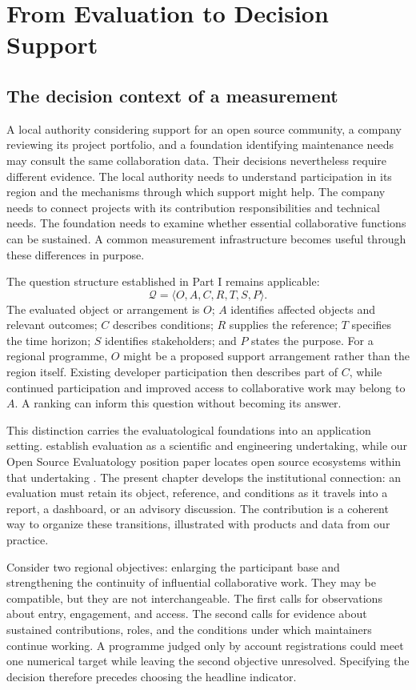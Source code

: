 \section{From Evaluation to Decision Support}
\label{sec:ch10-decision}

\subsection{The decision context of a measurement}
A local authority considering support for an open source community, a company reviewing its project portfolio, and a foundation identifying maintenance needs may consult the same collaboration data. Their decisions nevertheless require different evidence. The local authority needs to understand participation in its region and the mechanisms through which support might help. The company needs to connect projects with its contribution responsibilities and technical needs. The foundation needs to examine whether essential collaborative functions can be sustained. A common measurement infrastructure becomes useful through these differences in purpose.

The question structure established in Part I remains applicable:
\[
\mathcal Q=\langle O,A,C,R,T,S,P\rangle.
\]
The evaluated object or arrangement is \(O\); \(A\) identifies affected objects and relevant outcomes; \(C\) describes conditions; \(R\) supplies the reference; \(T\) specifies the time horizon; \(S\) identifies stakeholders; and \(P\) states the purpose. For a regional programme, \(O\) might be a proposed support arrangement rather than the region itself. Existing developer participation then describes part of \(C\), while continued participation and improved access to collaborative work may belong to \(A\). A ranking can inform this question without becoming its answer.

This distinction carries the evaluatological foundations into an application setting. \citet{zhan2024} establish evaluation as a scientific and engineering undertaking, while our Open Source Evaluatology position paper locates open source ecosystems within that undertaking \citep{han2024ose}. The present chapter develops the institutional connection: an evaluation must retain its object, reference, and conditions as it travels into a report, a dashboard, or an advisory discussion. The contribution is a coherent way to organize these transitions, illustrated with products and data from our practice.

Consider two regional objectives: enlarging the participant base and strengthening the continuity of influential collaborative work. They may be compatible, but they are not interchangeable. The first calls for observations about entry, engagement, and access. The second calls for evidence about sustained contributions, roles, and the conditions under which maintainers continue working. A programme judged only by account registrations could meet one numerical target while leaving the second objective unresolved. Specifying the decision therefore precedes choosing the headline indicator.

